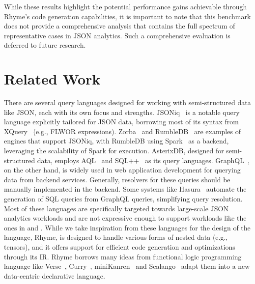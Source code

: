 \documentclass[runningheads]{llncs}
\newcommand{\lang}{Rhyme}
\begin{document}
While these results highlight the potential performance gains achievable
through \lang{}'s code generation capabilities, it is important to note
that this benchmark does not provide a comprehensive analysis that contains the
full spectrum of representative cases in JSON analytics.
Such a comprehensive evaluation is deferred to future research.

\section{Related Work}\label{sec:related_work}
There are several query languages designed for working with semi-structured data like
JSON, each with its own focus and strengths.
JSONiq~\cite{jsoniq,jsoniq_paper} is a notable query language explicitly tailored for
JSON data, borrowing most of its syntax from XQuery~\cite{xquery} (e.g., FLWOR expressions).
Zorba~\cite{zobra} and RumbleDB~\cite{rumble_vldb} are examples of engines that support
JSONiq, with RumbleDB using Spark~\cite{spark} as a backend, leveraging the scalability
of Spark for execution.
AsterixDB, designed for semi-structured data, employs AQL~\cite{aql} and SQL++~\cite{sqlpp}
as its query languages.
GraphQL~\cite{graphql}, on the other hand, is widely used in web application development
for querying data from backend services.
Generally, resolvers for these queries should be manually implemented in the backend.
Some systems like Hasura~\cite{hasura} automate the generation of SQL queries from
GraphQL queries, simplifying query resolution.
Most of these languages are specifically targeted towards large-scale JSON analytics workloads
and are not expressive enough to support workloads like the ones
in  and .
While we take inspiration from these languages for the design of the language,
\lang{}, is designed to handle various forms of nested data (e.g., tensors),
and it offers support for efficient code generation and optimizations
through its IR.
\lang{} borrows many ideas from functional logic programming language like
Verse~\cite{verse}, Curry~\cite{curry}, miniKanren~\cite{miniKanren_thesis} and 
Scalango~\cite{scalango} adapt them into a new data-centric declarative language.



\end{document}
